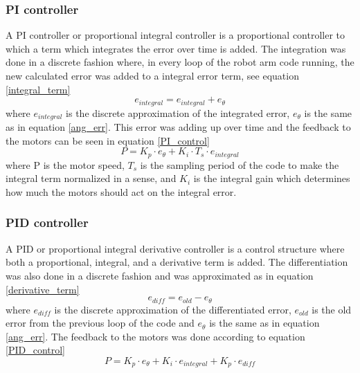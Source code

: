 \subsubsection{PI controller}
A PI controller or proportional integral controller is a proportional controller to which a term which integrates the error over time is added. The integration was done in a discrete fashion where, in every loop of the robot arm code running, the new calculated error was added to a integral error term, see equation \ref{integral_term}
\begin{equation}
    e_{integral} = e_{integral} + e_{\theta}
    \label{integral_term}
\end{equation}
where \(e_{integral}\) is the discrete approximation of the integrated error, \(e_{\theta}\) is the same as in equation \ref{ang_err}. This error was adding up over time and the feedback to the motors can be seen in equation \ref{PI_control}
\begin{equation}
    P = K_p\cdot e_{\theta} + K_i\cdot T_s\cdot e_{integral}
    \label{PI_control}
\end{equation}
where P is the motor speed, \(T_s\) is the sampling period of the code to make the integral term normalized in a sense, and \(K_i\) is the integral gain which determines how much the motors should act on the integral error.

\subsubsection{PID controller}
A PID or proportional integral derivative controller is a control structure where both a proportional, integral, and a derivative term is added. The differentiation was also done in a discrete fashion and was approximated as in equation \ref{derivative_term}
\begin{equation}
    e_{diff} = e_{old} - e_{\theta}
    \label{derivative_term}
\end{equation}
where \(e_{diff}\) is the discrete approximation of the differentiated error, \(e_{old}\) is the old error from the previous loop of the code and \(e_{\theta}\) is the same as in equation \ref{ang_err}. The feedback to the motors was done according to equation \ref{PID_control}
\begin{equation}
    P = K_p\cdot e_{\theta} + K_i\cdot e_{integral} + K_p\cdot e_{diff}
    \label{PID_control}
\end{equation}

